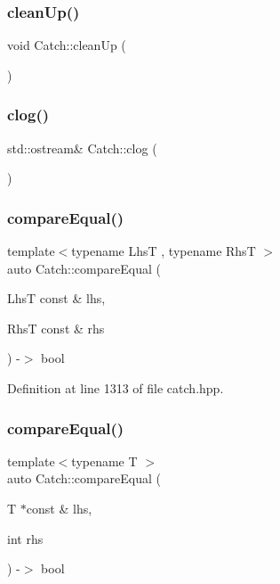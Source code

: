 \subsubsection{\texorpdfstring{clean\+Up()}{cleanUp()}}
{\footnotesize\ttfamily void Catch\+::clean\+Up (\begin{DoxyParamCaption}{ }\end{DoxyParamCaption})}

\mbox{\label{namespace_catch_a5a0677089050dcdb4848f56fb47e9279}} 
\subsubsection{\texorpdfstring{clog()}{clog()}}
{\footnotesize\ttfamily std\+::ostream\& Catch\+::clog (\begin{DoxyParamCaption}{ }\end{DoxyParamCaption})}

\mbox{\label{namespace_catch_af89b8df30cfaf09abd048c6ff67359ee}} 
\subsubsection{\texorpdfstring{compare\+Equal()}{compareEqual()}\hspace{0.1cm}{\footnotesize\ttfamily [1/5]}}
{\footnotesize\ttfamily template$<$typename LhsT , typename RhsT $>$ \\
auto Catch\+::compare\+Equal (\begin{DoxyParamCaption}\item[{LhsT const \&}]{lhs,  }\item[{RhsT const \&}]{rhs }\end{DoxyParamCaption}) -\/$>$ bool }



Definition at line 1313 of file catch.\+hpp.

\mbox{\label{namespace_catch_a68f451c45e65f242dde5f21c19a4cf7a}} 
\subsubsection{\texorpdfstring{compare\+Equal()}{compareEqual()}\hspace{0.1cm}{\footnotesize\ttfamily [2/5]}}
{\footnotesize\ttfamily template$<$typename T $>$ \\
auto Catch\+::compare\+Equal (\begin{DoxyParamCaption}\item[{T $\ast$const \&}]{lhs,  }\item[{int}]{rhs }\end{DoxyParamCaption}) -\/$>$ bool }



